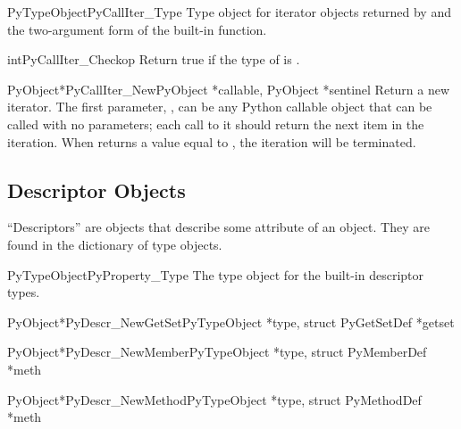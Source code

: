 \begin{cvardesc}{PyTypeObject}{PyCallIter_Type}
  Type object for iterator objects returned by
   and the two-argument form of the
   built-in function.
\end{cvardesc}

\begin{cfuncdesc}{int}{PyCallIter_Check}{op}
  Return true if the type of  is .
\end{cfuncdesc}

\begin{cfuncdesc}{PyObject*}{PyCallIter_New}{PyObject *callable,
                                             PyObject *sentinel}
  Return a new iterator.  The first parameter, , can be
  any Python callable object that can be called with no parameters;
  each call to it should return the next item in the iteration.  When
   returns a value equal to , the
  iteration will be terminated.
\end{cfuncdesc}


\subsection{Descriptor Objects \label{descriptor-objects}}

``Descriptors'' are objects that describe some attribute of an object.
They are found in the dictionary of type objects.

\begin{cvardesc}{PyTypeObject}{PyProperty_Type}
  The type object for the built-in descriptor types.
\end{cvardesc}

\begin{cfuncdesc}{PyObject*}{PyDescr_NewGetSet}{PyTypeObject *type,
					        struct PyGetSetDef *getset}
\end{cfuncdesc}

\begin{cfuncdesc}{PyObject*}{PyDescr_NewMember}{PyTypeObject *type,
					        struct PyMemberDef *meth}
\end{cfuncdesc}

\begin{cfuncdesc}{PyObject*}{PyDescr_NewMethod}{PyTypeObject *type,
                                                struct PyMethodDef *meth}
\end{cfuncdesc}

